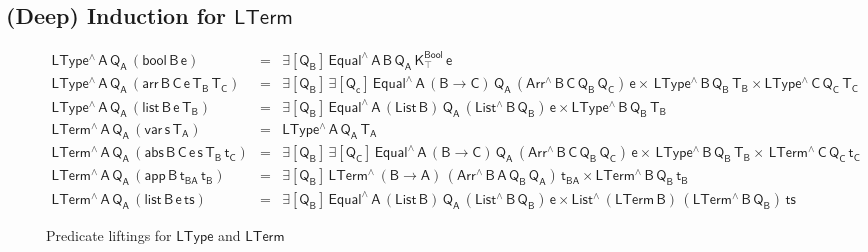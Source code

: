 \documentclass[sigplan,screen]{acmart}
\begin{document}
\subsection{(Deep) Induction for $\mathsf{LTerm}$}\label{sec:ind-lam} 

\begin{figure*}[t]


  \begin{adjustbox}{varwidth=7.3in, max width=7.1in, margin=-0.0in 0in
      -0.2in 0in, center} 

  {\small
\[\begin{array}{lll}
\mathsf{LType^{\wedge}\,A\,Q_A\,(bool\,B\,e)} & = &\mathsf{\exists
  [Q_B]\, Equal^{\wedge}\, A\, B\, Q_A\, K^{Bool}_{\top} \,e}\\
\mathsf{LType^{\wedge}\,A\,Q_A\,(arr\, B\, C\, e\, T_B\, T_C)}
&=&\mathsf{\exists [Q_B] \,\exists [Q_c]\, Equal^{\wedge}\,A\,
  (B \to C)\, Q_A\, (Arr^{\wedge} \, B\, C\, Q_B \, Q_C) \, e \times
  \, LType^{\wedge}\,B\,Q_B\,T_B \times LType^{\wedge}\,C\,Q_C\,T_C}\\
\mathsf{LType^{\wedge}\,A\,Q_A\,(list\, B\, e\, T_B)} & = &
\mathsf{\exists [Q_B]\, Equal^{\wedge}\,A\, (List\, B)\, Q_A\,
  (List^{\wedge} \, B\, Q_B) \, e \times LType^{\wedge}\,B\,Q_B\,T_B}\\[1ex]
\mathsf{LTerm^{\wedge}\,A\,Q_A\,(var\,s\,T_A)} & = &
\mathsf{LType^{\wedge}\, A\, Q_A\, T_A}\\
\mathsf{LTerm^{\wedge}\,A\,Q_A\, (abs \,B \,C \,e \,s \,T_B \,t_C)} &
= & \mathsf{\exists [Q_B]\,\exists [Q_C]\, Equal^{\wedge} \, A\, (B \to
  C)\, Q_A\, (Arr^{\wedge} \, B\, C\, Q_B \, Q_C)\, e \times \,
  LType^{\wedge}\, B\, Q_B\, T_B \times \, LTerm^{\wedge}\, C\, Q_C\,
  t_C }\\
\mathsf{LTerm^{\wedge}\,A\,Q_A\, (app\, B\, t_{BA}\, t_B)} & = &
\mathsf{\exists [Q_B]\, LTerm^{\wedge}\, (B \to A)\, (Arr^{\wedge} \,
  B\, A\, Q_B \, Q_A)\, t_{BA} \times LTerm^{\wedge}\, B\, Q_B\,
  t_B}\\
\mathsf{LTerm^{\wedge}\,A\,Q_A\, (list\, B\, e\, ts)} & = &
\mathsf{\exists [Q_B]\, Equal^{\wedge} \, A\, (List\,B)\, Q_A\,
  (List^{\wedge} \, B\, Q_B) \, e \times List^{\wedge}\, (LTerm\,B) \,
  (LTerm^{\wedge} \, B\, Q_B) \, ts}
\end{array}   \]}

\vspace*{-0.1in}

\caption{Predicate liftings for $\mathsf{LType}$ and
  $\mathsf{LTerm}$}\label{fig:liftings} \vspace*{0.1in} 
\end{adjustbox}
\end{figure*}
\end{document}
